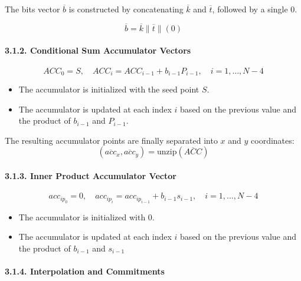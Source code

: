 \documentclass[
]{article}
\providecommand{\tightlist}{%
  \setlength{\itemsep}{0pt}\setlength{\parskip}{0pt}}
\begin{document}
The bits vector \(\overline{b}\) is constructed by concatenating
\(\overline{k}\) and \(\overline{t}\), followed by a single 0.

\[\overline{b} = \overline{k} \| \overline{t} \| (0)\]

\hypertarget{conditional-sum-accumulator-vectors}{%
\paragraph{3.1.2. Conditional Sum Accumulator
Vectors}\label{conditional-sum-accumulator-vectors}}

\[
ACC_0 = S, \quad ACC_i = ACC_{i-1} + b_{i-1}P_{i-1}, \quad i = 1, \ldots, N-4
\]

\begin{itemize}
\tightlist
\item
  The accumulator is initialized with the seed point \(S\).
\item
  The accumulator is updated at each index \(i\) based on the previous
  value and the product of \(b_{i-1}\) and \(P_{i-1}\).
\end{itemize}

The resulting accumulator points are finally separated into \(x\) and
\(y\) coordinates: \[
(\overline{acc}_x, \overline{acc}_y) = \text{unzip}(\overline{ACC})
\]

\hypertarget{inner-product-accumulator-vector}{%
\paragraph{3.1.3. Inner Product Accumulator
Vector}\label{inner-product-accumulator-vector}}

\[
acc_{ip_0} = 0, \quad acc_{ip_i} = acc_{ip_{i-1}} + b_{i-1}s_{i-1}, \quad i = 1, \ldots, N-4
\]

\begin{itemize}
\tightlist
\item
  The accumulator is initialized with \(0\).
\item
  The accumulator is updated at each index \(i\) based on the previous
  value and the product of \(b_{i-1}\) and \(s_{i-1}\)
\end{itemize}

\hypertarget{interpolation-and-commitments}{%
\paragraph{3.1.4. Interpolation and
Commitments}\label{interpolation-and-commitments}}
\end{document}
